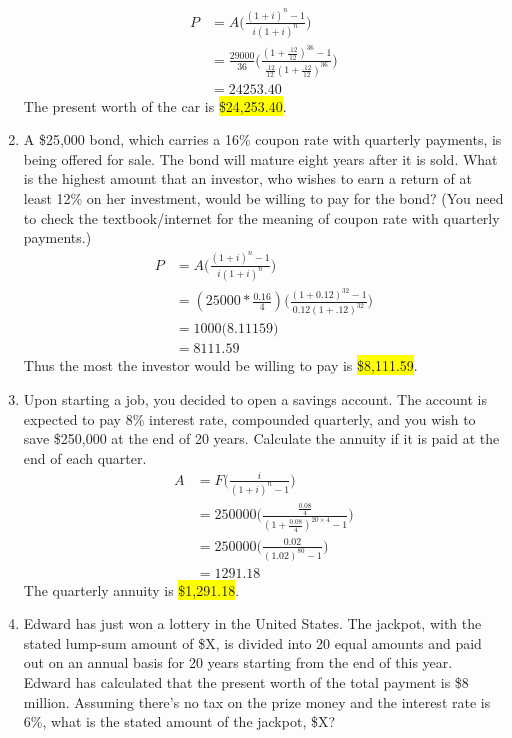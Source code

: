 \documentclass[12pt]{article}
\newcommand{\hilight}[1]{\colorbox{yellow}{#1}}
\begin{document}
\begin{enumerate}[label=\textbf{Q\arabic*}]
  \begin{align*}
  P &= A\bigg(\frac{{(1+i)}^n - 1}{i{(1+i)}^n}\bigg)\\
  &= \frac{29000}{36}\bigg(\frac{{(1+\frac{.12}{12})}^{36} - 1}{\frac{.12}{12}{(1+\frac{.12}{12})}^{36}}\bigg)\\
  &= 24253.40
  \end{align*}
  The present worth of the car is \hilight{\$24,253.40}.
\item A \$25,000 bond, which carries a 16\% coupon rate with quarterly payments, is being offered for sale. The bond will mature eight years after it is sold. What is the highest amount that an investor, who wishes to earn a return of at least 12\% on her investment, would be willing to pay for the bond? (You need to check the textbook/internet for the meaning of coupon rate with quarterly payments.)
  \begin{align*}
  P &= A\bigg(\frac{{(1+i)}^n - 1}{i{(1+i)}^n}\bigg)\\
  &= (25000*\frac{0.16}{4})\bigg(\frac{{(1+0.12)}^{32} - 1}{0.12{(1+.12)}^{32}}\bigg)\\
  &= 1000\bigg(8.11159\bigg)\\
  &= 8111.59
  \end{align*}
  Thus the most the investor would be willing to pay is \hilight{\$8,111.59}.
\item Upon starting a job, you decided to open a savings account. The account is expected to pay 8\% interest rate, compounded quarterly, and you wish to save \$250,000 at the end of 20 years. Calculate the annuity if it is paid at the end of each quarter.
  \begin{align*}
  A &= F\bigg(\frac{i}{{(1+i)}^n - 1}\bigg)\\
  &= 250000\bigg(\frac{\frac{0.08}{4}}{{(1+\frac{0.08}{4})}^{20\times 4} - 1}\bigg)\\
  &= 250000\bigg(\frac{0.02}{{(1.02)}^{80} - 1}\bigg)\\
  &= 1291.18
  \end{align*}
  The quarterly annuity is \hilight{\$1,291.18}.
\item Edward has just won a lottery in the United States. The jackpot, with the stated lump-sum amount of \$X, is divided into 20 equal amounts and paid out on an annual basis for 20 years starting from the end of this year. Edward has calculated that the present worth of the total payment is \$8 million. Assuming there’s no tax on the prize money and the interest rate is 6\%, what is the stated amount of the jackpot, \$X?\@

\end{enumerate}
\end{document}
